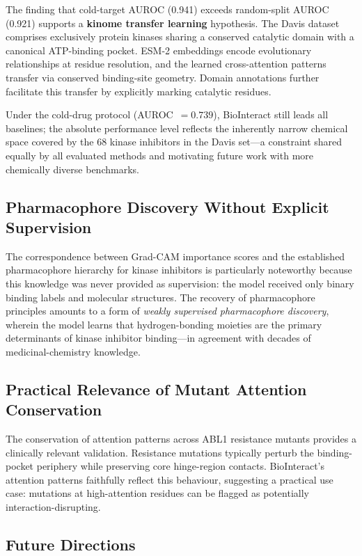 \documentclass[fleqn,10pt]{wlscirep}
\begin{document}
The finding that cold-target AUROC (0.941) exceeds random-split AUROC (0.921)
supports a \textbf{kinome transfer learning} hypothesis.  The Davis dataset
comprises exclusively protein kinases sharing a conserved catalytic domain with
a canonical ATP-binding pocket.  ESM-2 embeddings encode evolutionary
relationships at residue resolution, and the learned cross-attention patterns
transfer via conserved binding-site geometry.  Domain annotations further
facilitate this transfer by explicitly marking catalytic residues.

Under the cold-drug protocol (AUROC~$=0.739$), BioInteract still leads all
baselines; the absolute performance level reflects the inherently narrow chemical
space covered by the 68 kinase inhibitors in the Davis set---a constraint shared
equally by all evaluated methods and motivating future work with more
chemically diverse benchmarks.

\subsection{Pharmacophore Discovery Without Explicit Supervision}

The correspondence between Grad-CAM importance scores and the established
pharmacophore hierarchy for kinase inhibitors is particularly noteworthy because
this knowledge was never provided as supervision: the model received only binary
binding labels and molecular structures.  The recovery of pharmacophore
principles amounts to a form of \emph{weakly supervised pharmacophore
discovery}, wherein the model learns that hydrogen-bonding moieties are the
primary determinants of kinase inhibitor binding---in agreement with decades of
medicinal-chemistry knowledge.\cite{zhang2009targeting}

\subsection{Practical Relevance of Mutant Attention Conservation}

The conservation of attention patterns across ABL1 resistance mutants provides a
clinically relevant validation.  Resistance mutations typically perturb the
binding-pocket periphery while preserving core hinge-region
contacts.\cite{shah2002multiple}  BioInteract's attention patterns faithfully
reflect this behaviour, suggesting a practical use case: mutations at
high-attention residues can be flagged as potentially interaction-disrupting.

\subsection{Future Directions}
\end{document}

